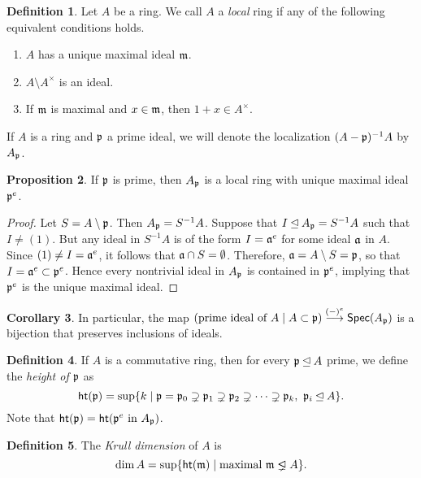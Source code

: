 \documentclass[10pt,letterpaper,cm]{nupset}
\theoremstyle{definition}
\newtheorem{definition}{Definition}[subsection]
\theoremstyle{theorem}
\newtheorem{prop}[definition]{Proposition}
\newtheorem{corollary}[definition]{Corollary}
\theoremstyle{remark}
\newcommand{\1}{\mathbf{1}}
\newcommand{\p}{\frak{p}}
\newcommand{\0}{\vec 0}
\newcommand{\properideal}{%
  \mathrel{\ooalign{$\lneq$\cr\raise.22ex\hbox{$\lhd$}\cr}}}
\begin{document}
\begin{definition}
Let $A$ be a ring. We call $A$ a \textit{local} ring if any of the following equivalent conditions holds.
\begin{enumerate}[label=(\alph*)]
\item $A$ has a unique maximal ideal $\frak{m}$.
\item $A \setminus A^{\times}$ is an ideal.
\item If $\frak{m}$ is maximal and $x\in \frak{m}$, then $1+x \in A^{\times}$. 
\end{enumerate}
If $A$ is a ring and $\p$ a prime ideal, we will denote the localization $(A- \p)^{-1}A $ by $A_{\p}$. 
\end{definition}

\begin{prop}
 If $\p$ is prime, then $A_{\p}$ is a local ring with unique maximal ideal $\p^e$.
\end{prop}
\begin{proof}
Let $S = A \setminus \p$. Then $A_{\p} = S^{-1}A$. Suppose that $I \unlhd A_{\p} = S^{-1}A$  such that $I \ne (1)$. But any ideal in $S^{-1}A$ is of the form $I = \frak{a}^e$ for some ideal $\frak{a}$ in $A$. Since $(1) \ne I = \frak{a}^e$, it follows that $\frak{a} \cap S = \emptyset$. Therefore, $\frak{a} = A \setminus S = \p$, so that $I= \frak{a}^e \subset \p^e$. Hence every nontrivial ideal in $A_{\p}$ is contained in $\p^e$, implying that $\p^e$ is the unique maximal ideal. 
\end{proof}

\begin{corollary}
In particular, the map $(\text{prime ideal of } A \mid A \subset \p) \overset{(-)^e}{\longrightarrow} \mathsf{Spec}(A_{\p})$ is a bijection that preserves inclusions of ideals. 
\end{corollary}

\begin{definition}
If $A$ is a commutative ring, then for every $\p \unlhd A$ prime, we define the \textit{height of $\p$} as $$\mathsf{ht}(\p) = \sup\{ k \mid \p = \p_0 \supsetneq \p_1 \supsetneq \p_2 \supsetneq \cdots \supsetneq \p_k, \  \p_i \unlhd A   \}. $$ Note that $\mathsf{ht}(\p) = \mathsf{ht}(\p^e \text{ in } A_{\p})$.
\end{definition}

\begin{definition}
The \textit{Krull dimension} of $A$ is $$ \dim{A} = \sup \{  \mathsf{ht}(\frak{m}) \mid \text{maximal } \frak{m} \properideal A \}  .$$
\end{definition}
\end{document}
